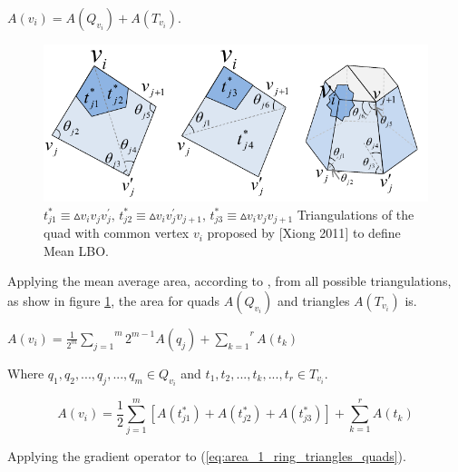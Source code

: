 \documentclass[10pt, conference]{IEEEtran}
\begin{document}
\begin{center}
$A\left(v_{i}\right)=A\left(Q_{v_{i}}\right)+A\left(T_{v_{i}}\right)$.
\par\end{center}

\begin{figure}[h]
\includegraphics[width=1\columnwidth]{figs/quad_xiong}

\caption{\label{fig:quad_xiong}$t_{j1}^{*}\equiv\vartriangle v_{i}v_{j}v_{j}^{\prime},\, t_{j2}^{*}\equiv\vartriangle v_{i}v_{j}^{\prime}v_{j+1},\, t_{j3}^{*}\equiv\vartriangle v_{i}v_{j}v_{j+1}$
Triangulations of the quad with common vertex $v_{i}$ proposed by
{[}Xiong 2011{]} to define Mean LBO.}
\end{figure}


Applying the mean average area, according to \cite{Xiong2011}, from
all possible triangulations, as show in figure \ref{fig:quad_xiong},
the area for quads $\ensuremath{A\left(Q_{v_{i}}\right)}$ and triangles
$A\left(T_{v_{i}}\right)$ is.

\begin{center}
$A\left(v_{i}\right)=\frac{1}{2^{m}}\overset{m}{\underset{j=1}{\sum}}2^{m-1}A\left(q_{j}\right)+\overset{r}{\underset{k=1}{\sum}}A\left(t_{k}\right)$
\par\end{center}

Where $q_{1},q_{2},...,q_{j},...,q_{m}\in Q_{v_{i}}$ and $t_{1},t_{2},...,t_{k},...,t_{r}\in T_{v_{i}}$.

\begin{equation}
A\left(v_{i}\right)=\frac{1}{2}\overset{m}{\underset{j=1}{\sum}}\left[A\left(t_{j1}^{*}\right)+A\left(t_{j2}^{*}\right)+A\left(t_{j3}^{*}\right)\right]+\overset{r}{\underset{k=1}{\sum}}A\left(t_{k}\right)\label{eq:area_1_ring_triangles_quads}
\end{equation}


Applying the gradient operator to (\ref{eq:area_1_ring_triangles_quads}).
\end{document}
